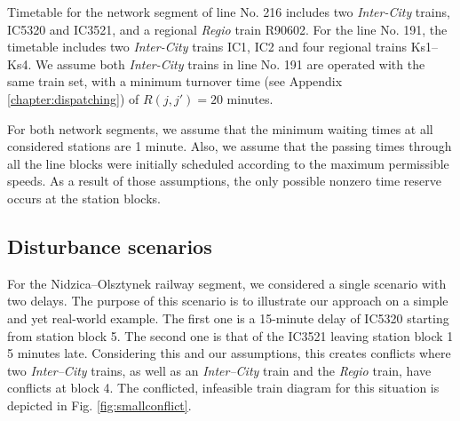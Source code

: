 Timetable for the network segment of line No. 216 includes two
\emph{Inter-City} trains, IC5320 and IC3521, and a regional \emph{Regio} train
R90602. For the line No. 191, the timetable includes two \emph{Inter-City}
trains IC1, IC2 and four regional trains Ks1--Ks4. We assume both
\emph{Inter-City} trains in line No. 191 are operated with the same train set,
with a minimum turnover time (see Appendix \ref{chapter:dispatching}) of $R(j,j') = 20$ minutes.

For both network segments, we assume that the minimum waiting times at all
considered stations are 1 minute. Also, we assume that the passing times
through all the line blocks were initially scheduled according to the maximum
permissible speeds. As a result of those assumptions, the only possible nonzero
time reserve occurs at the station blocks.

\subsection{Disturbance scenarios}

For the Nidzica--Olsztynek railway segment, we considered a single scenario
with two delays. The purpose of this scenario is to illustrate our approach on
a simple and yet real-world example. The first one is a 15-minute delay of
IC5320 starting from station block 5. The second one is that of the IC3521
leaving station block 1 5 minutes late. Considering this and our assumptions,
this creates conflicts where two \emph{Inter--City} trains, as well as an
\emph{Inter--City} train and the \emph{Regio} train, have conflicts at block 4.
The conflicted, infeasible train diagram for this situation is depicted in Fig.
\ref{fig:smallconflict}.

